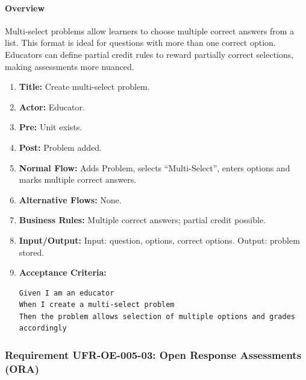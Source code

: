 \paragraph{Overview}
Multi‑select problems allow learners to choose multiple correct answers from a list. This format is ideal for questions with more than one correct option. Educators can define partial credit rules to reward partially correct selections, making assessments more nuanced.
\begin{enumerate}[label=\textbf{\arabic*.}]
\item \textbf{Title:} Create multi-select problem.
\item \textbf{Actor:} Educator.
\item \textbf{Pre:} Unit exists.
\item \textbf{Post:} Problem added.
\item \textbf{Normal Flow:} Adds Problem, selects “Multi-Select”, enters options and marks multiple correct answers.
\item \textbf{Alternative Flows:} None.
\item \textbf{Business Rules:} Multiple correct answers; partial credit possible.
\item \textbf{Input/Output:} Input: question, options, correct options. Output: problem stored.
\item \textbf{Acceptance Criteria:}
    \begin{verbatim}
Given I am an educator
When I create a multi-select problem
Then the problem allows selection of multiple options and grades accordingly
    \end{verbatim}
\end{enumerate}

\subsubsection{Requirement UFR-OE-005-03: Open Response Assessments (ORA)}
